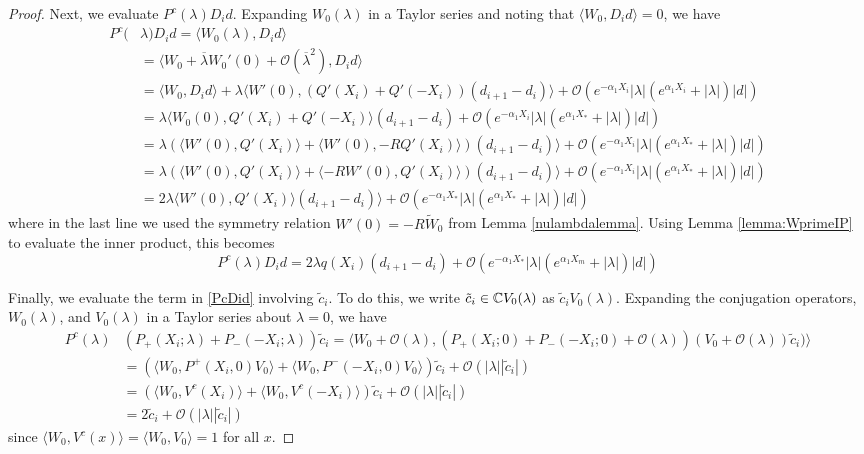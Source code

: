 \documentclass[thesis.tex]{subfiles}
\begin{document}
\begin{lemma}
\begin{proof}
Next, we evaluate $P^c(\lambda)D_i d$. Expanding $W_0(\lambda)$ in a Taylor series and noting that $\langle W_0, D_i d \rangle = 0$, we have 
\begin{align*}
P^c(&\lambda)D_i d = \langle W_0(\lambda), D_i d \rangle \\
&= \langle W_0 + \overline{\lambda} W_0'(0) + \mathcal{O}(\overline{\lambda}^2), D_i d \rangle \\
&= \langle W_0, D_i d \rangle + \lambda \langle W'(0), (Q'(X_i) + Q'(-X_i))(d_{i+1} - d_i ) \rangle + \mathcal{O}(e^{-\alpha_1 X_i} |\lambda|(e^{\alpha_1 X_i} + |\lambda|)|d|) \\
&= \lambda \langle W_0(0), Q'(X_i) + Q'(-X_i) \rangle (d_{i+1} - d_i ) + \mathcal{O}(e^{-\alpha_1 X_i} |\lambda|(e^{\alpha_1 X_*} + |\lambda|)|d|) \\
&= \lambda ( \langle W'(0), Q'(X_i) \rangle + \langle W'(0), -R Q'(X_i)\rangle )(d_{i+1} - d_i ) \rangle + \mathcal{O}(e^{-\alpha_1 X_i} |\lambda|(e^{\alpha_1 X_*} + |\lambda|)|d|)\\
&= \lambda \left( \langle W'(0), Q'(X_i) \rangle + \langle -R W'(0), Q'(X_i)\rangle \right)(d_{i+1} - d_i ) \rangle + \mathcal{O}(e^{-\alpha_1 X_i} |\lambda|(e^{\alpha_1 X_*} + |\lambda|)|d|) \\
&= 2 \lambda \langle W'(0), Q'(X_i) \rangle (d_{i+1} - d_i ) \rangle + \mathcal{O}(e^{-\alpha_1 X_*} |\lambda|(e^{\alpha_1 X_*} + |\lambda|)|d|)
\end{align*}
where in the last line we used the symmetry relation $W'(0) = -R \tilde{W}_0$ from Lemma \ref{nulambdalemma}. Using Lemma \ref{lemma:WprimeIP} to evaluate the inner product, this becomes
\begin{equation}\label{PcDid2}
P^c(\lambda)D_i d = 2 \lambda q(X_i) (d_{i+1} - d_i ) + \mathcal{O}(e^{-\alpha_1 X_*} |\lambda|(e^{\alpha_1 X_m} + |\lambda|)|d|)
\end{equation}

Finally, we evaluate the term in \cref{PcDid} involving $\tilde{c}_i$. To do this, we write $\tilde{c}_i \in \mathbb{C} V_0(\lambda)$ as $\tilde{c}_i V_0(\lambda)$. Expanding the conjugation operators, $W_0(\lambda)$, and $V_0(\lambda)$ in a Taylor series about $\lambda = 0$, we have
\begin{align*}
P^c(\lambda) &(P_+(X_i; \lambda) + P_-(-X_i; \lambda))\tilde{c}_i 
= \langle W_0 + \mathcal{O}(\lambda), (P_+(X_i; 0) + P_-(-X_i; 0) + \mathcal{O}(\lambda))(V_0 + \mathcal{O}(\lambda))\tilde{c}_i) \rangle \\
&= \left( \langle W_0, P^+(X_i, 0)V_0 \rangle + \langle W_0, P^-(-X_i, 0)V_0 \rangle \right)\tilde{c}_i + \mathcal{O}(|\lambda||\tilde{c}_i|) \\
&= \left( \langle W_0, V^c(X_i) \rangle + \langle W_0, V^c(-X_i) \rangle \right)\tilde{c}_i + \mathcal{O}(|\lambda||\tilde{c}_i|) \\
&= 2 \tilde{c}_i + \mathcal{O}(|\lambda||\tilde{c}_i|)
\end{align*}
since $\langle W_0, V^c(x) \rangle = \langle W_0, V_0 \rangle = 1$ for all $x$. 


\end{proof}
\end{lemma}
\end{document}
